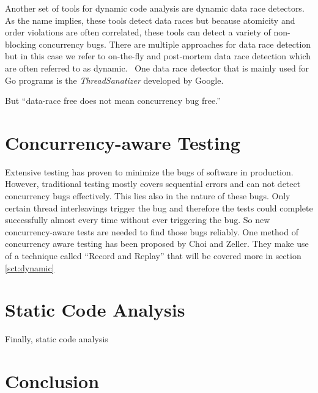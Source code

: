 \documentclass[conference]{IEEEtran}
\begin{document}
Another set of tools for dynamic code analysis are dynamic data race detectors.
As the name implies, these tools detect data races but because atomicity and order violations are often correlated, these tools can detect a variety of non-blocking concurrency bugs.
There are multiple approaches for data race detection but in this case we refer to on-the-fly and post-mortem data race detection which are often referred to as dynamic.~\cite{serebry2009threadsanitizer}
One data race detector that is mainly used for Go programs is the \emph{ThreadSanatizer} developed by Google.

But ``data-race free does not mean concurrency bug free.''~\cite{lu2008mistakes}

\section{Concurrency-aware Testing}
\label{sct:testing}

Extensive testing has proven to minimize the bugs of software in production.\cite{makinen2014testing}
However, traditional testing mostly covers sequential errors and can not detect concurrency bugs effectively.\cite{lu2008mistakes}
This lies also in the nature of these bugs.
Only certain thread interleavings trigger the bug and therefore the tests could complete successfully almost every time without ever triggering the bug.
So new concurrency-aware tests are needed to find those bugs reliably.
One method of concurrency aware testing has been proposed by Choi and Zeller.\cite{acm2002}
They make use of a technique called ``Record and Replay'' that will be covered more in section \ref{sct:dynamic}

\section{Static Code Analysis}
\label{sct:static}

Finally, static code analysis

\section{Conclusion}
\label{sct:conclusion}
\end{document}
